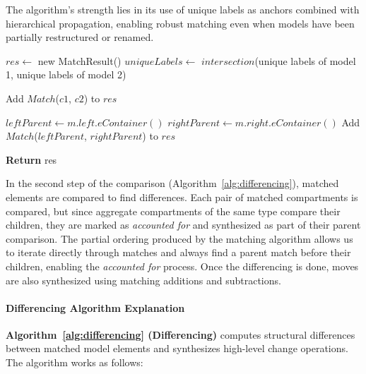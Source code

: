 The algorithm's strength lies in its use of unique labels as anchors combined with hierarchical propagation, enabling robust matching even when models have been partially restructured or renamed. 


\begin{algorithm}[th]
\caption{SameUniqueLabelMatch}
\label{alg:match}
\begin{algorithmic}
\State $res \gets$ new MatchResult()
\State $uniqueLabels \gets$ $intersection$(unique labels of model 1, unique labels of model 2)

            \State Add $Match$($c1$, $c2$) to $res$
        \EndIf
    \EndFor
\EndFor

    \State $leftParent \gets m.left.eContainer()$
    \State $rightParent \gets m.right.eContainer()$
        \State Add $Match$($leftParent$, $rightParent$) to $res$
    \EndIf
\EndFor

\State \textbf{Return} res
\end{algorithmic}
\end{algorithm}

In the second step of the comparison (Algorithm~\ref{alg:differencing}), matched elements are compared to find differences. Each pair of matched compartments is compared, but since aggregate compartments of the same type compare their children, they are marked as \emph{accounted for} and synthesized as part of their parent comparison. The partial ordering produced by the matching algorithm allows us to iterate directly through matches and always find a parent match before their children, enabling the \emph{accounted for} process.
Once the differencing is done, moves are also synthesized using matching additions and subtractions.

\paragraph{Differencing Algorithm Explanation}

\textbf{Algorithm~\ref{alg:differencing} (Differencing)} computes structural differences between matched model elements and synthesizes high-level change operations. The algorithm works as follows:

